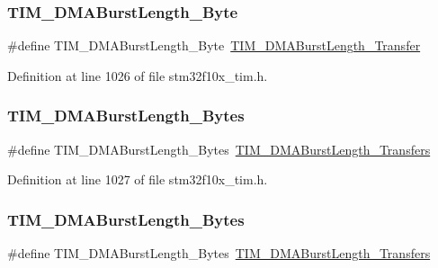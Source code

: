 \subsubsection{\texorpdfstring{T\+I\+M\+\_\+\+D\+M\+A\+Burst\+Length\+\_\+Byte}{TIM\_DMABurstLength\_1Byte}}
{\footnotesize\ttfamily \#define T\+I\+M\+\_\+\+D\+M\+A\+Burst\+Length\+\_\+Byte~\hyperlink{group___t_i_m___d_m_a___burst___length_gab87f91f1c5583b9888cb6bb37fc639e2}{T\+I\+M\+\_\+\+D\+M\+A\+Burst\+Length\+\_\+Transfer}}



Definition at line 1026 of file stm32f10x\+\_\+tim.\+h.

\mbox{\label{group___t_i_m___legacy_gabed2d89b663148923f4a7ca63d62d947}} 
\subsubsection{\texorpdfstring{T\+I\+M\+\_\+\+D\+M\+A\+Burst\+Length\+\_\+Bytes}{TIM\_DMABurstLength\_2Bytes}}
{\footnotesize\ttfamily \#define T\+I\+M\+\_\+\+D\+M\+A\+Burst\+Length\+\_\+Bytes~\hyperlink{group___t_i_m___d_m_a___burst___length_ga829504c3e8c90a9445f6a223bc3034f8}{T\+I\+M\+\_\+\+D\+M\+A\+Burst\+Length\+\_\+Transfers}}



Definition at line 1027 of file stm32f10x\+\_\+tim.\+h.

\mbox{\label{group___t_i_m___legacy_gad06dbc68a994da99b017a18a7197c0ad}} 
\subsubsection{\texorpdfstring{T\+I\+M\+\_\+\+D\+M\+A\+Burst\+Length\+\_\+Bytes}{TIM\_DMABurstLength\_3Bytes}}
{\footnotesize\ttfamily \#define T\+I\+M\+\_\+\+D\+M\+A\+Burst\+Length\+\_\+Bytes~\hyperlink{group___t_i_m___d_m_a___burst___length_ga3a99863a0925e0cc9a11b91aade66f11}{T\+I\+M\+\_\+\+D\+M\+A\+Burst\+Length\+\_\+Transfers}}



